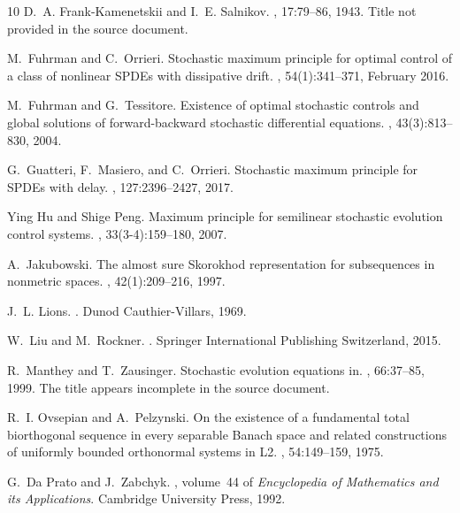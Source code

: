 \documentclass[a4paper,12pt]{article}
\numberwithin{equation}{section}
\begin{document}
\begin{thebibliography}{10}
D.~A. Frank-Kamenetskii and I.~E. Salnikov.
, 17:79--86, 1943.
\newblock Title not provided in the source document.

M.~Fuhrman and C.~Orrieri.
\newblock Stochastic maximum principle for optimal control of a class of nonlinear {SPDEs} with dissipative drift.
, 54(1):341--371, February 2016.

M.~Fuhrman and G.~Tessitore.
\newblock Existence of optimal stochastic controls and global solutions of forward-backward stochastic differential equations.
, 43(3):813--830, 2004.

G.~Guatteri, F.~Masiero, and C.~Orrieri.
\newblock Stochastic maximum principle for {SPDEs} with delay.
, 127:2396--2427, 2017.

Ying Hu and Shige Peng.
\newblock Maximum principle for semilinear stochastic evolution control systems.
, 33(3-4):159--180, 2007.

A.~Jakubowski.
\newblock The almost sure {Skorokhod} representation for subsequences in nonmetric spaces.
, 42(1):209--216, 1997.

J.~L. Lions.
.
\newblock Dunod Cauthier-Villars, 1969.

W.~Liu and M.~Rockner.
.
\newblock Springer International Publishing Switzerland, 2015.

R.~Manthey and T.~Zausinger.
\newblock Stochastic evolution equations in.
, 66:37--85, 1999.
\newblock The title appears incomplete in the source document.

R.~I. Ovsepian and A.~Pelzynski.
\newblock On the existence of a fundamental total biorthogonal sequence in every separable {Banach} space and related constructions of uniformly bounded orthonormal systems in {L2}.
, 54:149--159, 1975.

G.~Da Prato and J.~Zabchyk.
, volume~44 of {\em Encyclopedia of Mathematics and its Applications}.
\newblock Cambridge University Press, 1992.


\end{thebibliography}
\end{document}
